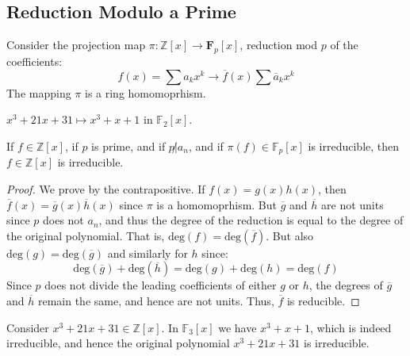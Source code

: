 \documentclass{article}                                                        %
\begin{document}
        \subsection{Reduction Modulo a Prime}
            Consider the projection map
            $\pi:\mathbb{Z}[x]\rightarrow\mathbf{F}_{p}[x]$, reduction mod $p$
            of the coefficients:
            \begin{equation}
                f(x)=\sum{a}_{k}x^{k}\longrightarrow
                    \overline{f}(x)\sum\overline{a}_{k}x^{k}
            \end{equation}
            The mapping $\pi$ is a ring homomoprhism.
            \begin{example}
                $x^{3}+21x+31\mapsto{x}^{3}+x+1$ in $\mathbb{F}_{2}[x]$.
            \end{example}
            \begin{theorem}
                If $f\in\mathbb{Z}[x]$, if $p$ is prime, and if $p\not|a_{n}$,
                and if $\pi(f)\in\mathbb{F}_{p}[x]$ is irreducible, then
                $f\in\mathbb{Z}[x]$ is irreducible.
            \end{theorem}
            \begin{proof}
                We prove by the contrapositive. If $f(x)=g(x)h(x)$, then
                $\overline{f}(x)=\overline{g}(x)\overline{h}(x)$ since $\pi$ is
                a homomoprhism. But $\overline{g}$ and $\overline{h}$ are not
                units since $p$ does not $a_{n}$, and thus the degree of the
                reduction is equal to the degree of the original polynomial.
                That is, $\textrm{deg}(f)=\textrm{deg}(\overline{f})$. But also
                $\textrm{deg}(g)=\textrm{deg}(\overline{g})$ and similarly for
                $h$ since:
                \begin{equation}
                    \textrm{deg}(\overline{g})+\textrm{deg}(\overline{h})
                    =\textrm{deg}(g)+\textrm{deg}(h)=\textrm{deg}(f)
                \end{equation}
                Since $p$ does not divide the leading coefficients of either
                $g$ or $h$, the degrees of $\overline{g}$ and $\overline{h}$
                remain the same, and hence are not units. Thus, $\overline{f}$
                is reducible.
            \end{proof}
            \begin{example}
                Consider $x^{3}+21x+31\in\mathbb{Z}[x]$. In $\mathbb{F}_{3}[x]$
                we have $x^{3}+x+1$, which is indeed irreducible, and hence
                the original polynomial $x^{3}+21x+31$ is irreducible.
            \end{example}
\end{document}
